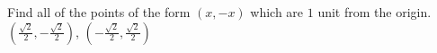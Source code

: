 {Find all of the points of the form $(x,-x)$ which are $1$ unit from the origin.}
{$\left(\frac{\sqrt{2}}{2},-\frac{\sqrt{2}}{2} \right)$, $\left(-\frac{\sqrt{2}}{2},\frac{\sqrt{2}}{2}\right)$}